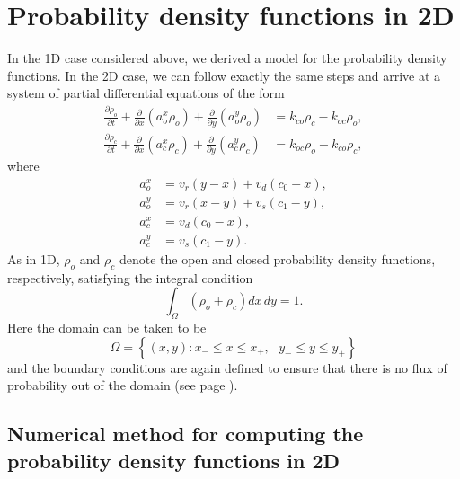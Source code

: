 
\section{Probability density functions in 2D}

In the 1D case considered above, we derived a model for the probability
density functions. In the 2D case, we can follow exactly the same steps and
arrive at a system of partial differential equations of the form
\begin{align}
\frac{\partial\rho_{o}}{\partial t}+\frac{\partial}{\partial x}\left(
a_{o}^{x}\rho_{o}\right)  +\frac{\partial}{\partial y}\left(  a_{o}^{y}
\rho_{o}\right)   &  =k_{co}\rho_{c}-k_{oc}\rho_{o},\label{eq:pdf21}\\
\frac{\partial\rho_{c}}{\partial t}+\frac{\partial}{\partial x}\left(
a_{c}^{x}\rho_{c}\right)  +\frac{\partial}{\partial y}\left(  a_{c}^{y}
\rho_{c}\right)   &  =k_{oc}\rho_{o}-k_{co}\rho_{c},\label{eq:pdf22}
\end{align}
where 
\begin{align}
a_{o}^{x} &  =v_{r}\left(  y-x\right)  +v_{d}\left(  c_{0}-x\right)
,\nonumber\\
a_{o}^{y} &  =v_{r}\left(  x-y\right)  +v_{s}\left(  c_{1}-y\right)
,\label{eq:fluxes2D2}\\
a_{c}^{x} &  =v_{d}\left(  c_{0}-x\right)  ,\nonumber\\
a_{c}^{y} &  =v_{s}\left(  c_{1}-y\right)  .\nonumber
\end{align}
As in 1D, $\rho_{o}$ and $\rho_{c}$ denote the open and closed probability
density functions, respectively, satisfying the integral condition
\begin{equation}
\int_{\Omega}\left(  \rho_{o}+\rho_c\right)  dx\, dy=1. \label{int10000}
\end{equation}
Here the domain can be taken to be
\begin{equation}
\Omega=\left\{  (x,y):x_{-}\leqslant x\leqslant x_{+},\text{ }y_{-}\leqslant
y\leqslant y_{+}\right\}
\end{equation}
and the boundary conditions are again defined to ensure that there is
no flux of probability out of the domain (see page \pageref{bc}).

\subsection{Numerical method for computing the probability density functions in 2D}

